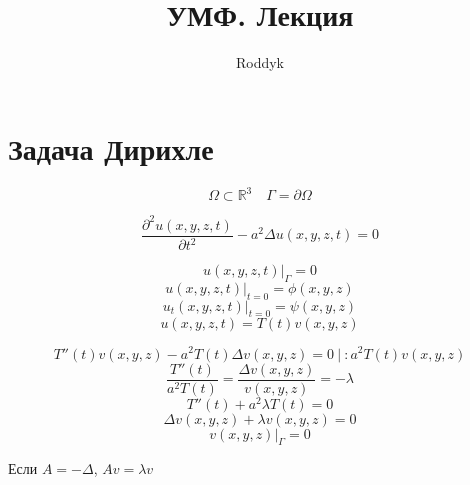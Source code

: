 \documentclass[a4paper]{article}
\begin{document}
\title{УМФ. Лекция}
\author{Roddyk}
\maketitle

\section*{\centering Задача Дирихле}
\[
    \Omega \subset \mathbb{R}^3 \quad \Gamma = \partial \Omega
\]
\begin{tcolorbox}
    \begin{equation}
        \frac{\partial^{2} u(x,y,z,t)}{\partial t^2} - a^2 \Delta u(x,y,z,t) = 0 
    \end{equation}

    \begin{equation}
        u(x,y,z,t) |_{\Gamma} = 0
    \end{equation}
    \begin{equation}
        u(x,y,z,t) |_{t=0} = \phi(x,y,z)
    \end{equation}
    \begin{equation}
        u_t(x,y,z,t) |_{t=0} = \psi(x,y,z)
    \end{equation}
    \begin{equation}
        u(x,y,z,t) = T(t) v(x,y,z)
    \end{equation}
\end{tcolorbox}
\[
    T''(t) v(x,y,z) - a^2 T(t) \Delta v(x,y,z) = 0 \ | \ : a^2T(t) v(x,y,z)
\]
\[
    \frac{T''(t)}{a^2T(t)} = \frac{\Delta v(x,y,z)}{v(x,y,z)} = -\lambda
\]
\begin{equation}
    T''(t) + a^2 \lambda T(t) = 0
\end{equation}
\begin{equation}
    \Delta v(x,y,z) + \lambda v(x,y,z) = 0
    \label{eq:7}
\end{equation}
\begin{equation}
    v(x,y,z) |_{\Gamma} = 0
\end{equation}

Если $ A = -\Delta $, $ Av = \lambda v $  
\end{document}
